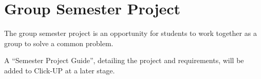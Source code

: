 \section{Group Semester Project}
        The group semester project is an opportunity for students to work together 
        as a group to solve a common problem.

        A ``Semester Project Guide'', detailing the project and requirements, will 
        be added to Click-UP at a later stage.